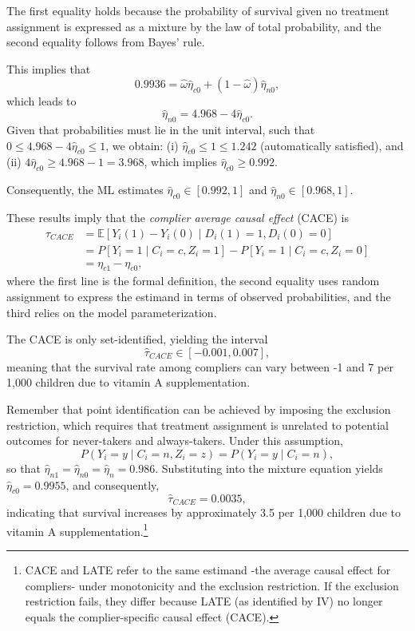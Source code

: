 The first equality holds because the probability of survival given no treatment assignment is expressed as a mixture by the law of total probability, and the second equality follows from Bayes' rule.

This implies that 
\[
0.9936 = \hat{\omega} \hat{\eta}_{c0} + (1-\hat{\omega})\hat{\eta}_{n0},
\]
which leads to 
\[
\hat{\eta}_{n0} = 4.968 - 4\hat{\eta}_{c0}.
\]
Given that probabilities must lie in the unit interval, such that $0 \leq 4.968 - 4\hat{\eta}_{c0} \leq 1$, we obtain:  
(i) $\hat{\eta}_{c0} \leq 1 \leq 1.242$ (automatically satisfied), and  
(ii) $4\hat{\eta}_{c0} \geq 4.968 - 1 = 3.968$, which implies $\hat{\eta}_{c0} \geq 0.992$.  

Consequently, the ML estimates $\hat{\eta}_{c0} \in [0.992, 1]$ and $\hat{\eta}_{n0} \in [0.968, 1]$.

These results imply that the \textit{complier average causal effect} (CACE) is
\begin{align*}
	\tau_{CACE} &= \mathbb{E}[Y_i(1)-Y_i(0)\mid D_i(1)=1,D_i(0)=0] \\
	&= P[Y_i = 1 \mid C_i = c, Z_i = 1] - P[Y_i = 1 \mid C_i = c, Z_i = 0] \\
	&= \eta_{c1} - \eta_{c0},
\end{align*}
where the first line is the formal definition, the second equality uses random assignment to express the estimand in terms of observed probabilities, and the third relies on the model parameterization.

The CACE is only set-identified, yielding the interval
\[
\hat{\tau}_{CACE} \in [-0.001, 0.007],
\]
meaning that the survival rate among compliers can vary between -1 and 7 per 1,000 children due to vitamin A supplementation.

Remember that point identification can be achieved by imposing the exclusion restriction, which requires that treatment assignment is unrelated to potential outcomes for never-takers and always-takers. Under this assumption,
\[
P(Y_i = y \mid C_i = n, Z_i = z) = P(Y_i = y \mid C_i = n),
\]
so that $\hat{\eta}_{n1} = \hat{\eta}_{n0} = \hat{\eta}_n = 0.986$. Substituting into the mixture equation yields $\hat{\eta}_{c0} = 0.9955$, and consequently,
\[
\hat{\tau}_{CACE} = 0.0035,
\]
indicating that survival increases by approximately 3.5 per 1,000 children due to vitamin A supplementation.\footnote{CACE and LATE refer to the same estimand -the average causal effect for compliers- under monotonicity and the exclusion restriction. If the exclusion restriction fails, they differ because LATE (as identified by IV) no longer equals the complier-specific causal effect (CACE).}
 
